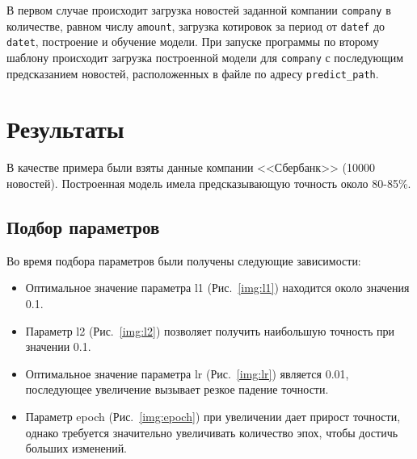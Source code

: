 \documentclass[14pt]{matmex-diploma-custom}
\begin{document}
В первом случае происходит загрузка новостей заданной компании \texttt{company} в количестве, равном числу \texttt{amount}, загрузка котировок за период от \texttt{datef} до \texttt{datet}, построение и обучение модели. При запуске программы по второму шаблону происходит загрузка построенной модели для \texttt{company} с последующим предсказанием новостей, расположенных в файле по адресу \texttt{predict\_path}.

\clearpage\section{Результаты}

В качестве примера были взяты данные компании <<Сбербанк>> (10000 новостей). Построенная модель имела предсказывающую точность около 80-85\%.

\subsection{Подбор параметров}

Во время подбора параметров были получены следующие зависимости:

\begin{itemize}
\item Оптимальное значение параметра l1 (Рис.~\ref{img:l1}) находится около значения 0.1.
\item Параметр l2 (Рис.~\ref{img:l2}) позволяет получить наибольшую точность при значении 0.1.
\item Оптимальное значение параметра lr (Рис.~\ref{img:lr}) является 0.01, последующее увеличение вызывает резкое падение точности.
\item Параметр epoch (Рис.~\ref{img:epoch}) при увеличении дает прирост точности, однако требуется значительно увеличивать количество эпох, чтобы достичь больших изменений.
\end{itemize}
\end{document}
